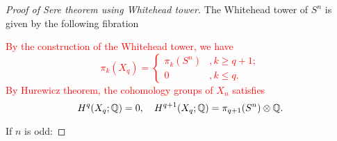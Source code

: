     \begin{proof}[Proof of Sere theorem using Whitehead tower]
        The Whitehead tower of $S^n$ is given by the following fibration
        \begin{center}
        \end{center}
        \textcolor{red}{
        By the construction of the Whitehead tower, we have 
        \begin{equation*}
            \pi_k(X_q) = 
            \begin{cases}
                \pi_k(S^n) &, k\geq q+1; \\
                0 &, k\leq q.
            \end{cases}
        \end{equation*}
        By Hurewicz theorem, the cohomology groups of $X_n$ satisfies
        \begin{equation*}
            H^{q}(X_q;\mathbb{Q}) = 0,\quad 
            H^{q+1}(X_q;\mathbb{Q}) = \pi_{q+1}(S^n)\otimes\mathbb{Q}.
        \end{equation*}
        }

        \noindent If $n$ is odd: 


\end{proof}
